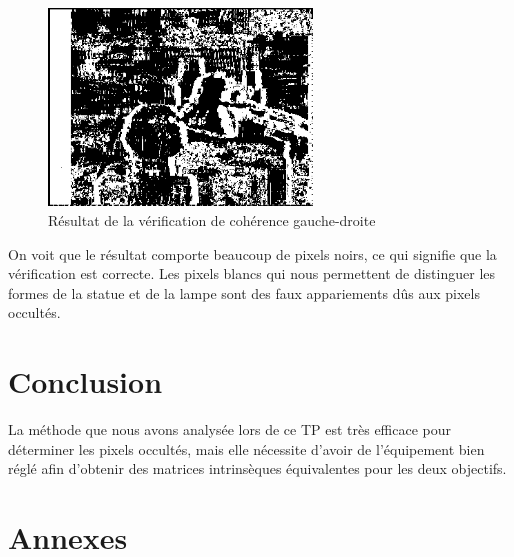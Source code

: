 \documentclass[a4paper,10pt]{article}
\begin{document}
\begin{figure}[!h]
 \centering
 \includegraphics[width=7cm]{validityMask.png}
 \caption{Résultat de la vérification de cohérence gauche-droite}
\end{figure}

On voit que le résultat comporte beaucoup de pixels noirs, ce qui signifie que la vérification est correcte.
Les pixels blancs qui nous permettent de distinguer les formes de la statue et de la lampe sont des faux appariements
dûs aux pixels occultés.

\section{Conclusion}
La méthode que nous avons analysée lors de ce TP est très efficace pour déterminer les pixels occultés, mais elle nécessite
d'avoir de l'équipement bien réglé afin d'obtenir des matrices intrinsèques équivalentes pour les deux objectifs.
\newpage
\section{Annexes}
\end{document}
